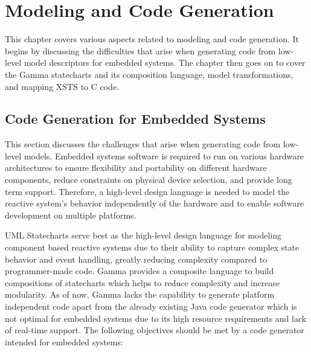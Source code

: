 \chapter{Modeling and Code Generation}

This chapter covers various aspects related to modeling and code generation. It begins by discussing the difficulties that arise when generating code from low-level model descriptors for embedded systems. The chapter then goes on to cover the Gamma statecharts and its composition language, model transformations, and mapping XSTS to C code.

\section{Code Generation for Embedded Systems}

This section discusses the challenges that arise when generating code from low-level models. Embedded systems\cite{Embedded} software is required to run on various hardware architectures to ensure flexibility and portability on different hardware components, reduce constraints on physical device selection, and provide long term support. Therefore, a high-level design language is needed to model the reactive system's behavior independently of the hardware and to enable software development on multiple platforms. 

UML Statecharts\cite{UMLState} serve best as the high-level design language for modeling component based reactive systems due to their ability to capture complex state behavior and event handling, greatly reducing complexity compared to programmer-made code. Gamma provides a composite language to build compositions of statecharts which helps to reduce complexity and increase modularity. As of now, Gamma lacks the capability to generate platform independent code apart from the already existing Java code generator which is not optimal for embedded systems due to its high resource requirements and lack of real-time support. The following objectives should be met by a code generator intended for embedded systems:

